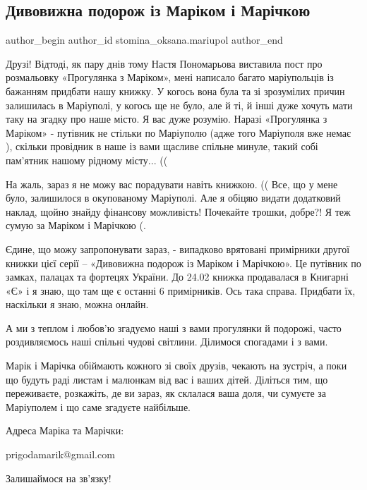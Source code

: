  
 
 
 
 

\subsection{Дивовижна подорож із Маріком і Марічкою}
\label{sec:24_01_2023.fb.stomina_oksana.mariupol.1.divovizhna_podorozh_}

\ifcmt
 author_begin
   author_id stomina_oksana.mariupol
 author_end
\fi

Друзі! Відтоді, як пару днів тому Настя Пономарьова виставила пост про
розмальовку «Прогулянка з Маріком», мені написало багато маріупольців із
бажанням придбати нашу книжку. У когось вона була та зі зрозумілих причин
залишилась в Маріуполі, у когось ще не було, але й ті, й інші дуже хочуть мати
таку на згадку про наше місто. Я вас дуже розумію. Наразі «Прогулянка з
Маріком» - путівник не стільки по Маріуполю (адже того Маріуполя вже немає 🙁
), скільки провідник в наше із вами щасливе спільне минуле, такий собі
пам'ятник нашому рідному місту... ((

На жаль, зараз я не можу вас порадувати навіть
книжкою. (( Все, що у мене було, залишилося в
окупованому Маріуполі.  Але я обіцяю видати додатковий
наклад, щойно знайду фінансову можливість! Почекайте
трошки, добре?!  Я теж сумую за Маріком і Марічкою (. 

Єдине, що можу запропонувати зараз, - випадково
врятовані  примірники  другої книжки цієї серії –
«Дивовижна подорож із Маріком і Марічкою». Це
путівник по замках, палацах та фортецях України.  До
24.02 книжка продавалася в Книгарні «Є» і я знаю, що
там ще є останні 6 примірників.  Ось така справа.
Придбати їх, наскільки я знаю, можна онлайн. 

А ми з теплом і любов'ю згадуємо наші з вами
прогулянки й подорожі, часто роздивляємось наші
спільні чудові світлини. Ділимося спогадами і з
вами.

Марік і Марічка обіймають кожного зі своїх друзів,
чекають на зустріч, а поки що будуть раді листам і
малюнкам від вас і ваших дітей. Діліться тим, що
переживаєте, розкажіть, де ви зараз, як склалася
ваша доля, чи сумуєте за Маріуполем і що саме
згадуєте найбільше. 

Адреса Маріка та Марічки:  

prigodamarik@gmail.com

Залишаймося на зв'язку!

